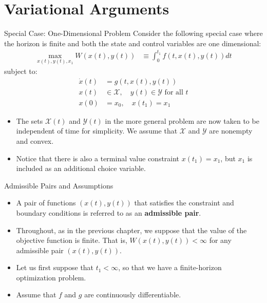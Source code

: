 \documentclass[9pt,aspectratio=169]{beamer}
\newcommand{\X}{\mathcal{X}}
\newcommand{\Y}{\mathcal{Y}}
\begin{document}
\section{Variational Arguments}

\begin{frame}{Special Case: One-Dimensional Problem}
Consider the following special case where the horizon is finite and both the state and control variables are one dimensional:
\begin{align*}
\max_{x(t),y(t),x_1} W(x(t), y(t)) &\equiv \int_0^{t_1} f(t, x(t), y(t))dt
\end{align*}
subject to:
\begin{align*}
\dot{x}(t) &= g(t, x(t), y(t))\\
x(t) &\in \X, \quad y(t) \in \Y \text{ for all } t\\
x(0) &= x_0, \quad x(t_1) = x_1
\end{align*}
\begin{itemize}
    \item The sets $\X(t)$ and $\Y(t)$ in the more general problem are now
    taken to be independent of time for simplicity. We assume that
    $\X$ and $\Y$ are nonempty and convex.
    \item Notice that there is also a terminal value constraint $x(t_1) =
    x_1$, but $x_1$ is included as an additional choice variable.
\end{itemize}
\end{frame}

\begin{frame}{Admissible Pairs and Assumptions}
\begin{itemize}
\item A pair of functions $(x(t), y(t))$ that satisfies the constraint and boundary conditions is referred to as an \textbf{admissible pair}.
\item Throughout, as in the previous chapter, we suppose that the value of
the objective function is finite. That is, $W(x(t), y(t)) < \infty$ for any
admissible pair $(x(t), y(t))$.
\item Let us first suppose that $t_1 < \infty$, so that we have a
finite-horizon optimization problem.
\item Assume that $f$ and $g$ are continuously differentiable.
\end{itemize}
\end{frame}
\end{document}
